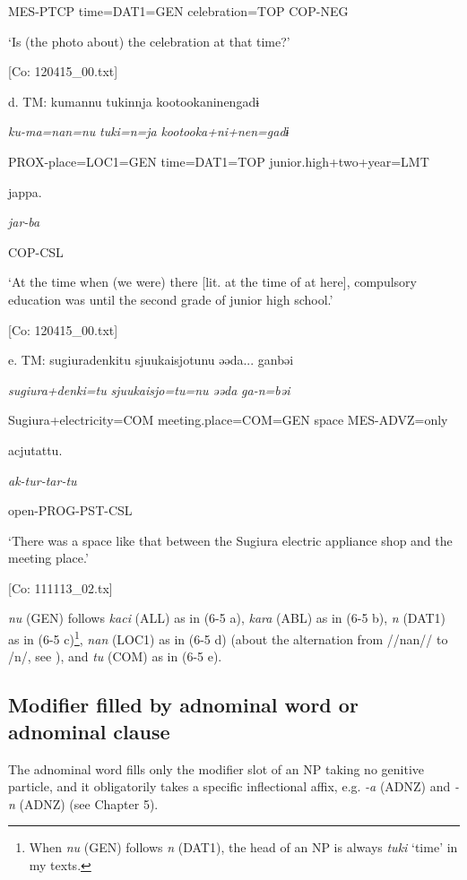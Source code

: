       MES-PTCP  time=DAT1=GEN  celebration=TOP  COP-NEG

      ‘Is (the photo about) the celebration at that time?’

      [Co: 120415\_00.txt]

  d.  TM:  kumannu  tukinnja  {\textbar}kootookaninen{\textbar}gadɨ

      \textit{ku-ma=nan=nu}  \textit{tuki=n=ja}  \textit{kootooka+ni+nen=gadɨ}

      PROX-place=LOC1=GEN  time=DAT1=TOP  junior.high+two+year=LMT

      jappa.

      \textit{jar-ba}

      COP-CSL

      ‘At the time when (we were) there [lit. at the time of at here], compulsory education was until the second grade of junior high school.’

      [Co: 120415\_00.txt]

  e.  TM:  {\textbar}sugiuradenki{\textbar}tu  {\textbar}sjuukaisjo{\textbar}tunu  əəda...  ganbəi

      \textit{sugiura+denki=tu}  \textit{sjuukaisjo=tu=nu}  \textit{əəda}  \textit{ga-n=bəi}

      Sugiura+electricity=COM  meeting.place=COM=GEN  space  MES-ADVZ=only

      acjutattu.

      \textit{ak-tur-tar-tu}

      open-PROG-PST-CSL

      ‘There was a space like that between the Sugiura electric appliance shop and the meeting place.’

      [Co: 111113\_02.tx]

\textit{nu} (GEN) follows \textit{kaci} (ALL) as in (6-5 a), \textit{kara} (ABL) as in (6-5 b), \textit{n} (DAT1) as in (6-5 c)\footnote{When \textit{nu} (GEN) follows \textit{n} (DAT1), the head of an NP is always \textit{tuki} ‘time’ in my texts.}, \textit{nan} (LOC1) as in (6-5 d) (about the alternation from //nan// to /n/, see ), and \textit{tu} (COM) as in (6-5 e).

\subsection{Modifier filled by adnominal word or adnominal clause}

The adnominal word fills only the modifier slot of an NP taking no genitive particle, and it obligatorily takes a specific inflectional affix, e.g. \textit{{}-a} (ADNZ) and \textit{{}-n} (ADNZ) (see Chapter 5).


